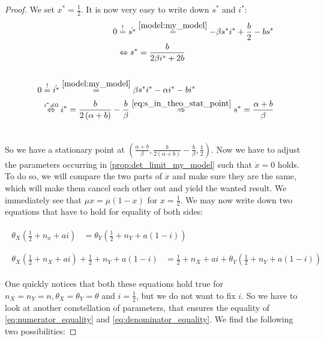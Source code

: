 \documentclass[12pt,a4paper,twoside]{article}
\begin{document}
\begin{proof}
	We set $x^* = \frac{1}{2}$. It is now very easy to write down $s^*$ and $i^*$:
	\begin{align}
	\begin{split}\label{eq:s_in_theo_stat_point}
		0 &\overset{!}{=} \dot{s^*} \overset{\eqref{model:my_model}}{=}-\beta s^*i^* + \frac{b}{2} - bs^*\\
		&\Leftrightarrow s^* = \frac{b}{2\beta i^*+ 2b}\\
		&\end{split}\\
		\begin{split}
		0 &\overset{!}{=} \dot{i^*} \overset{\eqref{model:my_model}}{=}\beta s^*i^* -\alpha i^* - bi^*\\
		&\overset{i^* \neq 0}{\Leftrightarrow} i^* = \frac{b}{2\left(\alpha + b\right)} - \frac{b}{\beta} \overset{\eqref{eq:s_in_theo_stat_point}}{\Rightarrow} s^* = \frac{\alpha + b}{\beta}\\
		&\end{split}
	\end{align}
	
	So we have a stationary point at $\left(\frac{\alpha + b}{\beta}, \frac{b}{2\left(\alpha + b\right)} - \frac{b}{\beta}, \frac{1}{2}\right)$. Now we have to adjust the parameters occurring in \eqref{prop:det_limit_my_model} such that $\dot{x} = 0$ holds. To do so, we will compare the two parts of $\dot{x}$ and make sure they are the same, which will make them cancel each other out and yield the wanted result. We immediately see that $\mu x = \mu\left(1-x\right)$ for $x = \frac{1}{2}$. We may now write down two equations that have to hold for equality of both sides:
	
	\begin{align}
		\begin{split}\label{eq:numerator_equality}
		\theta_X\left(\frac{1}{2}+n_x+ai\right) &= \theta_Y\left(\frac{1}{2}+n_Y+a(1-i)\right)\\
		&\end{split}\\
		\begin{split}\label{eq:denominator_equality}
		\theta_X\left(\frac{1}{2}+n_X+ai\right) + \frac{1}{2}+n_Y+a(1-i) &= \frac{1}{2}+n_X+ai+\theta_Y\left(\frac{1}{2}+n_Y+a(1-i)\right)\end{split}
	\end{align}
	
	One quickly notices that both these equations hold true for $n_X = n_Y = n, \theta_X = \theta_Y = \theta$ and $i = \frac{1}{2}$, but we do not want to fix $i$. So we have to look at another constellation of parameters, that ensures the equality of \eqref{eq:numerator_equality} and \eqref{eq:denominator_equality}. We find the following two possibilities:
	

\end{proof}
\end{document}
